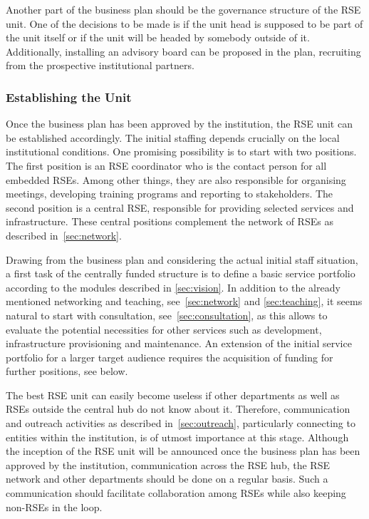 \documentclass[a4paper]{article}
\begin{document}
Another part of the business plan should be the governance structure of the RSE unit.
One of the decisions to be made is if the unit head is supposed to be part of the unit itself or if the unit will be headed by somebody outside of it.
Additionally, installing an advisory board can be proposed in the plan, recruiting from the prospective institutional partners.

\subsubsection{Establishing the Unit}
Once the business plan has been approved by the institution, the RSE unit can be established accordingly.
The initial staffing depends crucially on the local institutional conditions.
One promising possibility is to start with two positions.
The first position is an RSE coordinator who is the contact person for all embedded RSEs.
Among other things, they are also responsible for organising meetings, developing training programs and reporting to stakeholders.
The second position is a central RSE, responsible for providing selected services and infrastructure.
These central positions complement the network of RSEs as described in~\autoref{sec:network}.

Drawing from the business plan and considering the actual initial staff situation, a first task of the centrally funded structure is to define a basic service portfolio according to the modules described in \autoref{sec:vision}.
In addition to the already mentioned networking and teaching, see~\autoref{sec:network} and \autoref{sec:teaching}, it seems natural to start with consultation, see~\autoref{sec:consultation},
as this allows to evaluate the potential necessities for other services such as development, infrastructure provisioning and maintenance.
An extension of the initial service portfolio for a larger target audience requires the acquisition of funding for further positions, see below.

The best RSE unit can easily become useless if other departments as well as RSEs outside the central hub do not know about it.
Therefore, communication and outreach activities as described in~\autoref{sec:outreach}, particularly connecting to entities within the institution, is of utmost importance at this stage.
Although the inception of the RSE unit will be announced once the business plan has been approved by the institution, communication across the RSE hub, the RSE network and other departments should be done on a regular basis.
Such a communication should facilitate collaboration among RSEs while also keeping non-RSEs in the loop.
\end{document}
